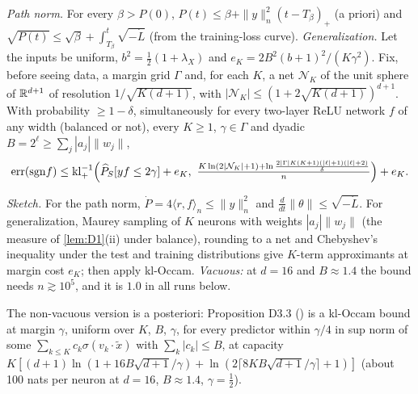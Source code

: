 \begin{theorem}\label{thm:D3}
\emph{Path norm.} For every $\beta>P(0)$, $P(t)\le\beta+\|y\|_n^2(t-T_\beta)_+$ (a priori) and $\sqrt{P(t)}\le\sqrt\beta+\int_{T_\beta}^t\sqrt{-\dot L}$ (from the training-loss curve).
\emph{Generalization.} Let the inputs be uniform, $b^2=\frac12(1+\lambda_X)$ and $e_K=2B^2(b+1)^2/(K\gamma^2)$. Fix, before seeing data, a margin grid $\Gamma$ and, for each $K$, a net $\mathcal N_K$ of the unit sphere of $\mathbb{R}^{d+1}$ of resolution $1/\sqrt{K(d+1)}$, with $|\mathcal N_K|\le(1+2\sqrt{K(d+1)})^{d+1}$. With probability $\ge1-\delta$, simultaneously for every two-layer ReLU network $f$ of any width (balanced or not), every $K\ge1$, $\gamma\in\Gamma$ and dyadic $B=2^\ell\ge\sum_j|a_j|\|w_j\|$,
\[
\mathrm{err}(\mathrm{sgn}f)\le\mathrm{kl}^{-1}_+\Bigl(\widehat P_S[yf\le2\gamma]+e_K,\ \tfrac{K\ln(2|\mathcal N_K|+1)+\ln\frac{2|\Gamma|K(K+1)(|\ell|+1)(|\ell|+2)}\delta}n\Bigr)+e_K .
\]
\end{theorem}
\noindent\emph{Sketch.} For the path norm, $\dot P=4\langle r,f\rangle_n\le\|y\|_n^2$ and $\frac d{dt}\|\theta\|\le\sqrt{-\dot L}$. For generalization, Maurey sampling of $K$ neurons with weights $|a_j|\|w_j\|$ (the measure of \cref{lem:D1}(ii) under balance), rounding to a net and Chebyshev's inequality under the test and training distributions give $K$-term approximants at margin cost $e_K$; then apply kl-Occam.
\emph{Vacuous:} at $d=16$ and $B\approx1.4$ the bound needs $n\gtrsim10^5$, and it is $1.0$ in all runs below.

The non-vacuous version is a posteriori: Proposition D3.3 () is a kl-Occam bound at margin $\gamma$, uniform over $K$, $B$, $\gamma$, for every predictor within $\gamma/4$ in sup norm of some $\sum_{k\le K}c_k\sigma(v_k\cdot\tilde x)$ with $\sum_k|c_k|\le B$, at capacity $K[(d+1)\ln(1+16B\sqrt{d+1}/\gamma)+\ln(2\lceil8KB\sqrt{d+1}/\gamma\rceil+1)]$ (about 100 nats per neuron at $d=16$, $B\approx1.4$, $\gamma=\frac12$).

